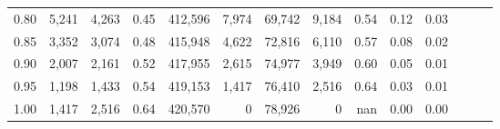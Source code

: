 \begin{tabular}{rrrrrrrrrrrrrr}
0.80 &   5,241 &  4,263 &  0.45 &  412,596 &    7,974 &  69,742 &   9,184 &  0.54 &  0.12 &      0.03 \\
0.85 &   3,352 &  3,074 &  0.48 &  415,948 &    4,622 &  72,816 &   6,110 &  0.57 &  0.08 &      0.02 \\
0.90 &   2,007 &  2,161 &  0.52 &  417,955 &    2,615 &  74,977 &   3,949 &  0.60 &  0.05 &      0.01 \\
0.95 &   1,198 &  1,433 &  0.54 &  419,153 &    1,417 &  76,410 &   2,516 &  0.64 &  0.03 &      0.01 \\
1.00 &   1,417 &  2,516 &  0.64 &  420,570 &        0 &  78,926 &       0 &   nan &  0.00 &      0.00 \\
\bottomrule
\end{tabular}
